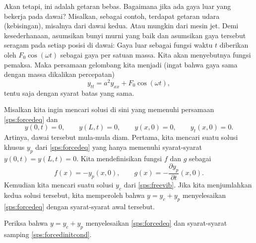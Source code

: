 Akan tetapi, ini adalah getaran bebas.  Bagaimana jika ada gaya luar yang bekerja pada
dawai?  Misalkan, sebagai contoh, terdapat getaran udara (kebisingan), misalnya dari dawai
kedua.  Atau mungkin dari mesin jet.  Demi kesederhanaan, asumsikan bunyi murni yang baik
dan asumsikan gaya tersebut seragam pada setiap posisi di dawai:
Gaya luar sebagai fungsi waktu $t$ diberikan oleh
$F_0 \cos (\omega t)$ sebagai gaya per satuan massa.
Kita akan menyebutnya fungsi pemaksa.  Maka persamaan
gelombang kita menjadi (ingat bahwa gaya sama dengan massa dikalikan percepatan)
\begin{equation} \label{sps:forcedeq}
y_{tt} = a^2 y_{xx} + F_0 \cos ( \omega t) ,
\end{equation}
tentu saja dengan syarat batas yang sama.

Misalkan kita ingin mencari solusi di sini yang memenuhi persamaan
\eqref{sps:forcedeq} dan
\begin{equation} \label{sps:forcedinitcond}
y(0,t) = 0, \qquad y(L,t) = 0, \qquad
y(x,0) = 0, \qquad y_t(x,0) = 0.
\end{equation}
Artinya, dawai tersebut mula-mula diam.  Pertama, kita mencari suatu solusi khusus
$y_p$ dari \eqref{sps:forcedeq} yang hanya memenuhi
syarat-syarat
$y(0,t) = y(L,t) = 0$.  Kita mendefinisikan fungsi $f$ dan $g$ sebagai
\begin{equation*}
f(x) = -y_p(x,0), \qquad g(x) = -\frac{\partial y_p}{\partial t} (x,0) .
\end{equation*}
Kemudian kita mencari suatu solusi $y_c$ dari \eqref{sps:freevib}.  Jika kita menjumlahkan kedua
solusi tersebut, kita memperoleh bahwa $y = y_c + y_p$ menyelesaikan \eqref{sps:forcedeq} dengan
syarat-syarat awal tersebut.

\begin{exercise}
Periksa bahwa $y = y_c + y_p$ menyelesaikan \eqref{sps:forcedeq} dan
syarat-syarat samping \eqref{sps:forcedinitcond}.
\end{exercise}

